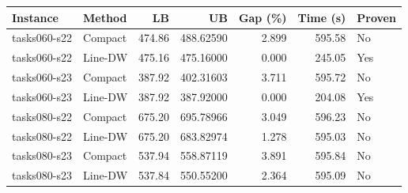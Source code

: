 \begin{tabular}{llrrrrl}
\hline
Instance & Method & LB & UB & Gap (\%) & Time (s) & Proven \\
\hline
tasks060-s22 & Compact & 474.86 & 488.62590 & 2.899 & 595.58 & No \\
tasks060-s22 & Line-DW & 475.16 & 475.16000 & 0.000 & 245.05 & Yes \\
tasks060-s23 & Compact & 387.92 & 402.31603 & 3.711 & 595.72 & No \\
tasks060-s23 & Line-DW & 387.92 & 387.92000 & 0.000 & 204.08 & Yes \\
tasks080-s22 & Compact & 675.20 & 695.78966 & 3.049 & 596.23 & No \\
tasks080-s22 & Line-DW & 675.20 & 683.82974 & 1.278 & 595.03 & No \\
tasks080-s23 & Compact & 537.94 & 558.87119 & 3.891 & 595.84 & No \\
tasks080-s23 & Line-DW & 537.84 & 550.55200 & 2.364 & 595.09 & No \\
\hline
\end{tabular}
